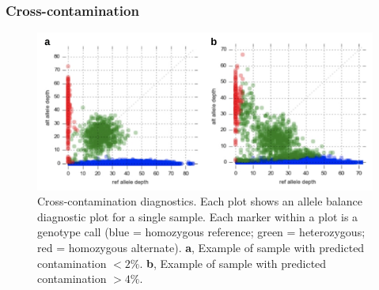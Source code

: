 \begin{refsection}
\subsubsection{Cross-contamination}


\begin{figure}[t!]
\centering
\includegraphics[width=\textwidth]{artwork/chapter3/contamination.pdf}
\caption{Cross-contamination diagnostics.
%
Each plot shows an allele balance diagnostic plot for a single sample.
%
Each marker within a plot is a genotype call (blue = homozygous reference; green = heterozygous; red = homozygous alternate).
%
\textbf{a}, Example of sample with predicted contamination $<2\%$.
%
\textbf{b}, Example of sample with predicted contamination $>4\%$.
}
%
\label{fig:ch3-contamination}
\end{figure}



\end{refsection}
